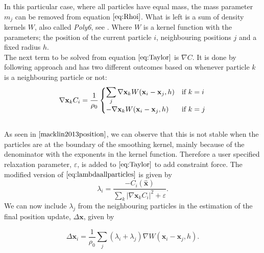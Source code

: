 In this particular case, where all particles have equal mass, the mass parameter $m_j$ can be removed from equation $\ref{eq:Rhoi}$. What is left is a sum of density kernels $W$, also called \textit{Poly6}, see \cite{macklin2013position}. Where $W$ is a kernel function with the parameters; the position of the current particle  $i$, neighbouring positions $j$ and a fixed radius $h$.
\\
The next term to be solved from equation $\ref{eq:Taylor}$ is $\nabla C$. It is done by following \cite{macklin2013position} approach and has two different outcomes based on whenever particle $k$ is a neighbouring particle or not:
\\
\begin{equation}
 \nabla \mathbf{x}_k C_i = \frac{1}{\rho_0}
  \begin{cases}
  \label{eq:NablaC}
   \displaystyle \sum\limits_{j} \nabla \mathbf{x}_k W(\mathbf{x}_i - \mathbf{x}_j, h) & $\text{if }$ k = i \\
   - \nabla \mathbf{x}_k W(\mathbf{x}_i - \mathbf{x}_j, h) & $\text{if }$ k = j \\
  \end{cases}
\end{equation}
\\
As seen in $\cite{macklin2013position}$, we can observe that this is not stable when the particles are at the boundary of the smoothing kernel, mainly because of the denominator with the exponents in the kernel function.
Therefore a user specified relaxation parameter, $\varepsilon$, is added to $\ref{eq:Taylor}$ to add constraint force. The modified version of $\ref{eq:lambdaallparticles}$ is given by
\begin{equation}
\label{eq:LambdaEpsilon}
\lambda_i = \frac{- C_i(\hat{\mathbf{x}}) }{ \sum\limits_{k} |\nabla \mathbf{x}_k C_i|^2 + \varepsilon}.
\end{equation}
We can now include $\lambda_j$ from the neighbouring particles in the estimation of the final position update, $\Delta \mathbf{x}$, given by

\begin{equation}
\label{eq:DeltaP}
\Delta \mathbf{x}_i = \frac{1}{\rho_0} \sum\limits_{j} (\lambda_i + \lambda_j) \nabla W(\mathbf{x}_i - \mathbf{x}_j, h).
\end{equation}

